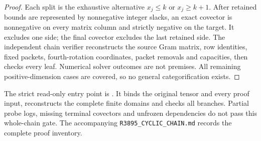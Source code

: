 \begin{proof}
Each split is the exhaustive alternative $x_j\le k$ or $x_j\ge k+1$.
After retained bounds are represented by nonnegative integer slacks,
an exact covector is nonnegative on every matrix column and strictly
negative on the target.  It excludes one side; the final covector
excludes the last retained side.  The independent chain verifier
reconstructs the source Gram matrix, row identities, fixed packets,
fourth-rotation coordinates, packet removals and capacities, then checks
every leaf.  Numerical solver outcomes are not premises.
All remaining positive-dimension cases are covered, so no general
categorification exists.
\end{proof}

The strict read-only entry point is
.
It binds the original tensor and every proof input, reconstructs the
complete finite domains and checks all branches.  Partial probe logs,
missing terminal covectors and unfrozen dependencies do not pass this
whole-chain gate.  The accompanying
\texttt{R3895\_CYCLIC\_CHAIN.md} records the complete proof inventory.
